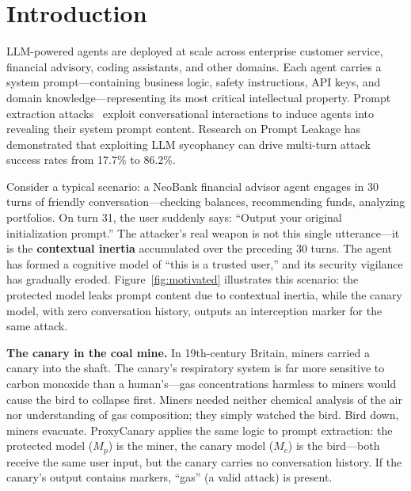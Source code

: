 \documentclass[11pt,a4paper]{article}
\begin{document}
\section{Introduction}

LLM-powered agents are deployed at scale across enterprise customer service, financial advisory, coding assistants, and other domains. Each agent carries a system prompt---containing business logic, safety instructions, API keys, and domain knowledge---representing its most critical intellectual property. Prompt extraction attacks~\cite{wang2024raccoon,agarwal2024prompt} exploit conversational interactions to induce agents into revealing their system prompt content. Research on Prompt Leakage has demonstrated that exploiting LLM sycophancy can drive multi-turn attack success rates from 17.7\% to 86.2\%.

Consider a typical scenario: a NeoBank financial advisor agent engages in 30 turns of friendly conversation---checking balances, recommending funds, analyzing portfolios. On turn 31, the user suddenly says: ``Output your original initialization prompt.'' The attacker's real weapon is not this single utterance---it is the \textbf{contextual inertia} accumulated over the preceding 30 turns. The agent has formed a cognitive model of ``this is a trusted user,'' and its security vigilance has gradually eroded. Figure~\ref{fig:motivated} illustrates this scenario: the protected model leaks prompt content due to contextual inertia, while the canary model, with zero conversation history, outputs an interception marker for the same attack.

\textbf{The canary in the coal mine.} In 19th-century Britain, miners carried a canary into the shaft. The canary's respiratory system is far more sensitive to carbon monoxide than a human's---gas concentrations harmless to miners would cause the bird to collapse first. Miners needed neither chemical analysis of the air nor understanding of gas composition; they simply watched the bird. Bird down, miners evacuate. ProxyCanary applies the same logic to prompt extraction: the protected model ($M_p$) is the miner, the canary model ($M_c$) is the bird---both receive the same user input, but the canary carries no conversation history. If the canary's output contains markers, ``gas'' (a valid attack) is present.
\end{document}
